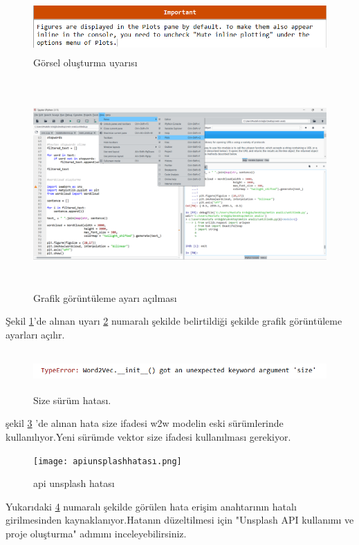 \documentclass[12pt, a4paper]{article}
\begin{document}
{{			\begin{figure}[h]
				\centering
				\includegraphics[width=12cm,height=2cm]{görsel oluşturma hatası .png}
				\caption{Görsel oluşturma uyarısı}
				\label{görsel1}
			\end{figure}
			
			\begin{figure}[h]
				\centering
				\includegraphics[width=12cm,height=8cm]{grafik görüntüleme.png}
				\caption{Grafik görüntüleme ayarı açılması}
				\label{grafik görüntüleme}
			\end{figure}
			
			\newpage
			Şekil \ref{görsel1}'de alınan uyarı \ref{grafik görüntüleme} numaralı şekilde belirtildiği şekilde grafik görüntüleme ayarları açılır.
			
			
			\begin{figure}[h]
				\centering
				\includegraphics[width=12cm,height=1.5cm]{sürümHatası.png}
				\caption{Size sürüm hatası.}
				\label{size}
			\end{figure}
			şekil \ref{size} 'de alınan hata size ifadesi w2w modelin eski sürümlerinde kullanılıyor.Yeni 
			sürümde vektor size ifadesi kullanılması gerekiyor.
			\begin{figure}[h]
				\centering
				\texttt{[image: apiunsplashhatası.png]}
				\caption{api unsplash hatası}
				\label{hata1}
			\end{figure}
			Yukarıdaki \ref{hata1} numaralı şekilde görülen hata erişim anahtarının hatalı girilmesinden kaynaklanıyor.Hatanın düzeltilmesi için "Unsplash API kullanımı ve proje oluşturma" adımını inceleyebilirsiniz.
			
}}
\end{document}
